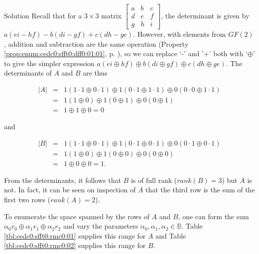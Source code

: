 \begin{vworkexampleparsection}{Solution}
Recall that for a $3 \times 3$ matrix
$\left[\begin{array}{ccc}a&b&c\\d&e&f\\g&h&i\end{array}\right]$,
the determinant is given by
$a(ei-hf) - b(di-gf) + c(dh - ge)$.  However, with
elements from $GF(2)$, addition and subtraction are the same 
operation (Property \ref{prop:enum:cedc0:sfft0:dff0:01:01}, p. \pageref{prop:enum:cedc0:sfft0:dff0:01:01}),
so we can replace `-' and '+' both with `$\oplus$' to give the
simpler expression 
$a(ei \oplus hf) \oplus b(di \oplus gf) \oplus c(dh \oplus ge)$.  The
determinants of $A$ and $B$ are thus

\begin{eqnarray}
\nonumber
|A| & = & 1 (1 \cdot 1 \oplus 0 \cdot 1) \oplus
          1 (0 \cdot 1 \oplus 1 \cdot 1) \oplus
          0 (0 \cdot 0 \oplus 1 \cdot 1)          \\
\label{eq:cedc0:sfft0:rmc0:02}
    & = & 1 (1 \oplus 0) \oplus 1 (0 \oplus 1) \oplus 0 (0 \oplus 1) \\
\nonumber
    & = & 1 \oplus 1 \oplus 0 = 0
\end{eqnarray}

\noindent{}and

\begin{eqnarray}
\nonumber
|B| & = & 1 (1 \cdot 1 \oplus 0 \cdot 1) \oplus
          1 (0 \cdot 1 \oplus 0 \cdot 1) \oplus
          0 (0 \cdot 1 \oplus 0 \cdot 1)          \\
\label{eq:cedc0:sfft0:rmc0:03}
    & = & 1 (1 \oplus 0) \oplus 1 (0 \oplus 0) \oplus 0 (0 \oplus 0) \\
\nonumber
    & = & 1 \oplus 0 \oplus 0 = 1  .
\end{eqnarray}

From the determinants, it follows that $B$ is of full rank ($rank(B)=3$) but $A$ is not.  
In fact,
it can be seen on inspection of $A$ that the third row is the sum of the first
two rows ($rank(A) = 2$).

To enumerate the space spanned by the rows of $A$ and $B$, one can form the sum
$\alpha_0 r_0 \oplus \alpha_1 r_1 \oplus \alpha_2 r_2$ and vary the parameters
$\alpha_0, \alpha_1, \alpha_2 \in \mathbb{B}$.  
Table \ref{tbl:cedc0:sfft0:rmc0:01} supplies this range for
$A$ and Table \ref{tbl:cedc0:sfft0:rmc0:02} supplies this range
for $B$.


\end{vworkexampleparsection}
